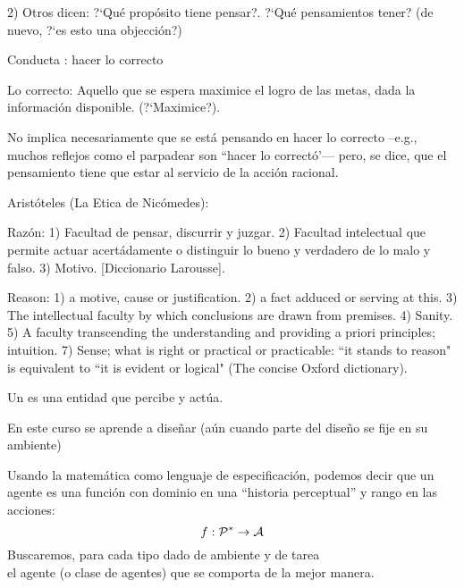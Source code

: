 \documentclass[10pt]{article}
\begin{document}
\begin{huge}
2) Otros dicen: ?`Qu{\'e} prop{\'o}sito tiene pensar?. ?`Qu{\'e}
pensamientos  tener? (de nuevo, ?`es esto una
objecci{\'o}n?)


Conducta : hacer lo correcto

Lo correcto: Aquello que se espera maximice el logro de las metas,
dada la informaci{\'o}n disponible. (?`Maximice?).

No implica necesariamente que se est{\'a} pensando en hacer lo
correcto --e.g., muchos reflejos como el parpadear son ``hacer lo
correct{\'o}'--- pero, se dice, que el pensamiento tiene que estar
al servicio de la acci{\'o}n racional.

Arist{\'o}teles (La Etica de Nic{\'o}medes):\al


\blob Raz{\'o}n: 1) Facultad de pensar, discurrir y juzgar. 2)
Facultad intelectual que permite actuar acert{\'a}damente o
distinguir lo bueno y verdadero de lo malo y falso. 3) Motivo.
[Diccionario Larousse].

\blob Reason: 1) a motive, cause or justification. 2) a fact
adduced or serving at this. 3) The intellectual faculty by which
conclusions are drawn from premises. 4) Sanity. 5) A faculty
transcending the understanding and providing a priori principles;
intuition. 7) Sense; what is right or practical or practicable:
``it stands to reason" is equivalent to ``it is evident or
logical" (The concise Oxford dictionary).


Un  es una entidad que percibe y act{\'u}a.

En este curso se aprende a dise{\~n}ar 
(a{\'u}n cuando parte del dise{\~n}o se fije en su ambiente)

Usando la matem{\'a}tica como lenguaje de especificaci{\'o}n,
podemos decir que un agente es una funci{\'o}n con dominio en una
``historia perceptual'' y rango en las acciones:
\[f: {\cal P}^* \rightarrow {\cal A}\]
Buscaremos, para cada tipo dado de ambiente y de tarea\\
el agente (o clase de agentes) que se comporta de la mejor manera.


\end{huge}
\end{document}
